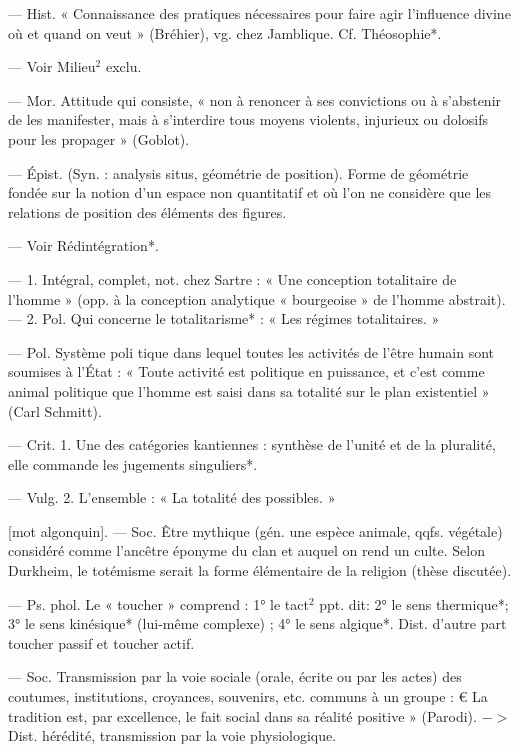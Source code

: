 \begin{itemize}[leftmargin=1cm, label=, itemsep=1pt]
 — Hist. « Connaissance des
pratiques nécessaires pour faire agir
l'influence divine où et quand on
veut » (Bréhier), vg. chez Jamblique.
Cf. Théosophie*.

 — Voir Milieu$^2$ exclu.

 — Mor. Attitude qui consiste, « non à renoncer à ses convictions ou à s'abstenir de les manifester, mais à s’interdire tous moyens
violents, injurieux ou dolosifs pour
les propager » (Goblot).

 — Épist. (Syn. : analysis
situs, géométrie de position). Forme
de géométrie fondée sur la notion
d’un espace non quantitatif et où
l’on ne considère que les relations
de position des éléments des figures.

 — Voir Rédintégration*.

 — 1. Intégral, complet,
not. chez Sartre : « Une conception
totalitaire de l’homme » (opp. à la
conception analytique « bourgeoise »
de l’homme abstrait). — 2. Pol.
Qui concerne le totalitarisme* : « Les
régimes totalitaires. »

 — Pol. Système poli
tique dans lequel toutes les activités
de l'être humain sont soumises à
l'État : « Toute activité est politique en puissance, et c'est comme
animal politique que l’homme est
saisi dans sa totalité sur le plan
existentiel » (Carl Schmitt).

 — Crit. 1. Une des catégories
kantiennes : synthèse de l’unité et
de la pluralité, elle commande les
jugements singuliers*.

— Vulg. 2. L'ensemble : « La totalité des possibles. »

 [mot algonquin]. — Soc. Être
mythique (gén. une espèce animale,
qqfs. végétale) considéré comme
l'ancêtre éponyme du clan et auquel
on rend un culte. Selon Durkheim,
le totémisme serait la forme élémentaire de la religion (thèse discutée).

 — Ps. phol. Le « toucher »
comprend : 1° le tact$^2$ ppt. dit: 2° le
sens thermique*; 3° le sens kinésique* (lui-même complexe) ; 4° le
sens algique*. Dist. d'autre part
toucher passif et toucher actif.

 — Soc. Transmission par
la voie sociale (orale, écrite ou par
les actes) des coutumes, institutions, croyances, souvenirs, etc.
communs à un groupe : € La tradition est, par excellence, le fait social
dans sa réalité positive » (Parodi).
$->$ Dist. hérédité, transmission par
la voie physiologique.


\end{itemize}
